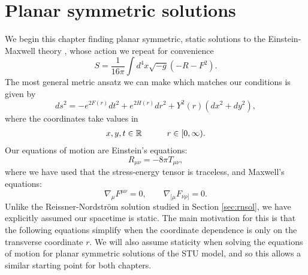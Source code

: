 \section{Planar symmetric solutions}
\label{sec:emsolutions}

We begin this chapter finding planar symmetric, static solutions to the Einstein-Maxwell theory , whose action we repeat for convenience
\begin{equation*}
	S = \frac{1}{16\pi} \int d^4x \sqrt{-g} (-R - F^2).
\end{equation*}
The most general metric ansatz we can make which matches our conditions is given by
\begin{equation*}
   ds^2 = -e^{2F(r)}dt^2 + e^{2H(r)} dr^2 + Y^2(r) (dx^2 + dy^2),
\end{equation*}
where the coordinates take values in
\begin{equation*}
\begin{aligned}
      &x,y,t \in {\mathbb{R}} \qquad && r \in [0,\infty).\\
\end{aligned}
\end{equation*}
Our equations of motion are Einstein's equations:
\begin{equation*}
R_{\mu \nu} = -8 \pi T_{\mu \nu},
\end{equation*}
where we have used that the stress-energy tensor is traceless, and Maxwell's equations:
\begin{equation}
   \nabla_\mu F^{\mu \nu} = 0, \qquad \nabla_{[\mu} F_{\nu \rho]} = 0.
\end{equation}
Unlike the Reissner-Nordstr\"om solution studied in Section \ref{sec:rnsol}, we have explicitly assumed our spacetime is static. The main motivation for this is that the following equations simplify when the coordinate dependence is only on the transverse coordinate $r$. We will also assume staticity when solving the equations of motion for planar symmetric solutions of the STU model, and so this allows a similar starting point for both chapters.
 

